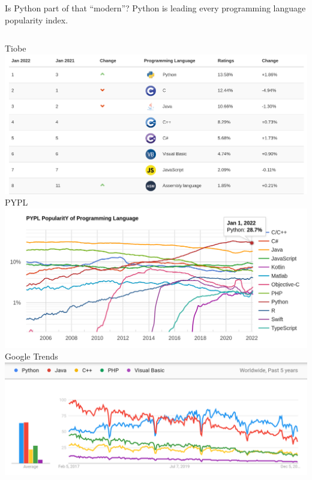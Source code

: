 \documentclass[aspectratio=169]{beamer}
\begin{document}
\begin{frame}{Is Python part of that ``modern''?}
\large
\vspace{0.25 cm}
Python is leading every programming language popularity index.
\vspace{0.25 cm}
\begin{columns}[t]
\centering Tiobe
\vspace{0.1 cm}
\includegraphics[width=\linewidth]{PLOTS/python-rankings-tiobe-2022.png}
\centering PYPL
\vspace{0.1 cm}
\includegraphics[width=\linewidth]{PLOTS/python-rankings-pypl-2022.png}
\centering Google Trends
\vspace{0.1 cm}
\includegraphics[width=\linewidth]{PLOTS/python-rankings-googletrends-2022.png}
\end{columns}

\end{frame}
\end{document}

